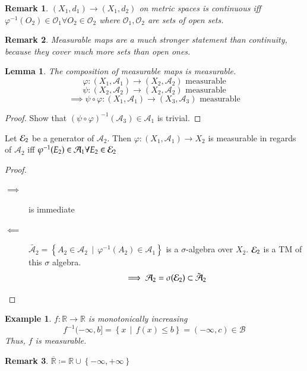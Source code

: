 \documentclass[a4paper]{article}
\newcounter{lecref}[section]
\numberwithin{lecref}{section}
\theoremstyle{break}
\newtheorem{example}[lecref]{Example}
\newtheorem{lemma}[lecref]{Lemma}
\newtheorem*{Remark}{Remark}
\newcommand{\Set}[1]{\left\{#1\right\}}
\newcommand{\SetDef}[2]{\left\{#1\,\mid\,#2\right\}}
\begin{document}
\begin{Remark}
  $(X_1, d_1) \to (X_1, d_2)$ on metric spaces is continuous iff $\varphi^{-1}(O_2) \in \mathcal O_1 \forall O_2 \in \mathcal O_2$ where $\mathcal O_1, \mathcal O_2$ are sets of open sets.
\end{Remark}

\begin{Remark}
  Measurable maps are a much stronger statement than continuity, because they cover much more sets than open ones.
\end{Remark}

\begin{lemma}
  The composition of measurable maps is measurable.
  \[ \varphi: (X_1, \mathcal A_1) \to (X_2, \mathcal A_2) \text{ measurable} \]
  \[ \psi: (X_2, \mathcal A_2) \to (X_2, \mathcal A_2) \text{ measurable} \]
  \[ \implies \psi \circ \varphi: (X_1, \mathcal A_1) \to (X_3, \mathcal A_3) \text{ measurable} \]
\end{lemma}
\begin{proof}
  Show that $(\psi \circ \varphi)^{-1} (\mathcal A_3) \in \mathcal A_1$ is trivial.
\end{proof}

\begin{theorem}
  Let ${\mathcal E}_2$ be a generator of $\mathcal A_2$. Then $\varphi: (X_1, \mathcal A_1) \to X_2$ is measurable in regards of $\mathcal A_2$ iff $\varphi^{-1}(E_2) \in \mathcal A_1 \forall E_2 \in {\mathcal E}_2$
\end{theorem}
\begin{proof}
  \begin{description}
    \item[$\implies$] is immediate
    \item[$\impliedby$] $\tilde{\mathcal A_2} = \SetDef{A_2 \in \mathcal A_2}{\varphi^{-1}(A_2) \in \mathcal A_1}$ is a $\sigma$-algebra over $X_2$. ${\mathcal E}_2$ is a TM of this $\sigma$ algebra.
    \[ \implies \mathcal A_2 = \sigma({\mathcal E}_2) \subset {\tilde{\mathcal A}}_2 \]
  \end{description}
\end{proof}

\begin{example}
  $f: \mathbb R \to \mathbb R$ is monotonically increasing
  \[ f^{-1}(-\infty,b] = \SetDef{x}{f(x) \leq b} = (-\infty, c) \in \mathcal B \]
  Thus, $f$ is measurable.
\end{example}

\begin{Remark}
  $\overline{\mathbb R} \coloneqq \mathbb R \cup \Set{-\infty, +\infty}$
\end{Remark}
\end{document}
